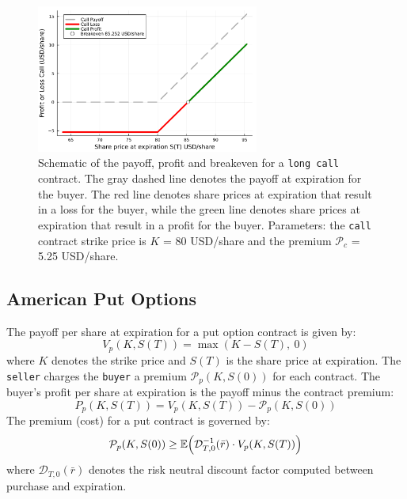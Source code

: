 \documentclass[11pt]{article}
\theoremstyle{definition}
\begin{document}
\begin{figure}[ht]
    \centering
    \includegraphics[width=0.65\textwidth]{./figs/Fig-Example-Call-K80-62DTE.pdf}
    \caption{Schematic of the payoff, profit and breakeven for a \texttt{long call} 
	contract. The gray dashed line denotes the payoff at expiration for the buyer.
	The red line denotes share prices at expiration that result in a loss for the buyer, 
	while the green line denotes share prices at expiration that result in a profit for the buyer.
	Parameters: the \texttt{call} 
	contract strike price is $K$ = 80 USD/share and the premium $\mathcal{P}_{c}$ = 5.25 USD/share.}\label{fig:call-payoff-profit-breakeven-diagram}
\end{figure}

\subsection{American Put Options}
The payoff per share at expiration for a put option contract is given by:
\begin{equation*}
V_{p}(K,S(T)) = \max\left(K - S(T),~0\right)
\end{equation*}
where $K$ denotes the strike price and $S(T)$ is the share price at expiration. 
The \texttt{seller} charges the \texttt{buyer} a premium $\mathcal{P}_{p}(K,S(0))$ for each contract.
The buyer's profit per share at expiration is the payoff minus the contract premium:
\begin{equation*}
P_{p}(K,S(T)) = V_{p}(K,S(T)) -  \mathcal{P}_{p}(K,S(0))
\end{equation*}
The premium (cost) for a put contract is governed by:
\begin{equation*}
\mathcal{P}_{p}(K,S(0))\geq\mathbb{E}\Bigl(\mathcal{D}^{-1}_{T,0}(\bar{r})\cdot{V_{p}}(K,S(T))\Bigr)
\end{equation*}
where $\mathcal{D}_{T,0}(\bar{r})$ denotes the risk neutral discount factor computed between purchase and expiration.
\end{document}
